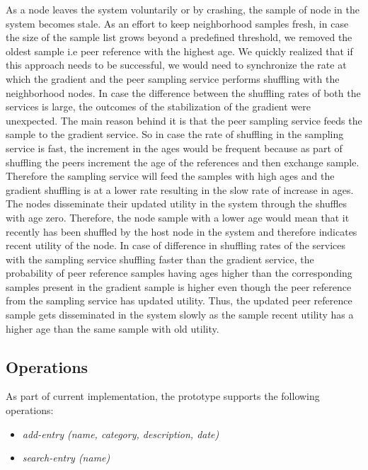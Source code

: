 \documentclass[12pt,a4paper,twoside,openright]{book}
\begin{document}
\par  As a node leaves the system voluntarily or by crashing, the sample of node in the system becomes stale. As an effort to keep neighborhood samples fresh, in case the size of the sample list grows beyond a predefined threshold, we removed the oldest sample i.e peer reference with the highest age. We quickly realized that if this approach needs to be successful, we would need to synchronize the rate at which the gradient and the peer sampling service performs shuffling with the neighborhood nodes. In case the difference between the shuffling rates of both the services is large, the outcomes of the stabilization of the gradient were unexpected. The main reason behind it is that the peer sampling service feeds the sample to the gradient service. So in case the rate of shuffling in the sampling service is fast, the increment in the ages would be frequent because as part of shuffling the peers increment the age of the references and then exchange sample. Therefore the sampling service will feed the samples with high ages and the gradient shuffling is at a lower rate resulting in the slow rate of increase in ages. The nodes disseminate their updated utility in the system through the shuffles with age zero. Therefore, the node sample with a lower age would mean that it recently has been shuffled by the host node in the system and therefore indicates recent utility of the node. In case of difference in shuffling rates of the services with the sampling service shuffling faster than the gradient service, the probability of peer reference samples having ages higher than the corresponding samples present in the gradient sample is higher even though the peer reference from the sampling service has updated utility. Thus, the updated peer reference sample gets disseminated in the system slowly as the sample recent utility has a higher age than the same sample with old utility.

\subsection{Operations}
As part of current implementation, the prototype supports the following operations:

\begin{itemize}

\item \textit{add-entry (name, category, description, date)}
\item \textit{search-entry (name)}

\end{itemize}
\end{document}
